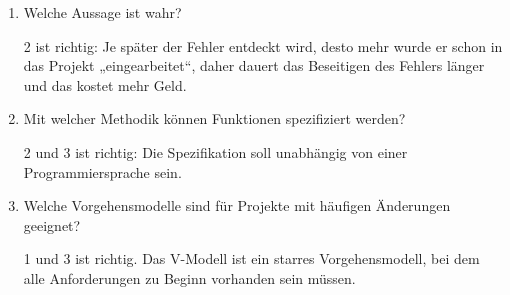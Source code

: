 \documentclass{lehramt-informatik}
\begin{document}
\begin{enumerate}


\item Welche Aussage ist wahr?


\begin{antwort}
2 ist richtig: Je später der Fehler entdeckt wird, desto mehr wurde er
schon in das Projekt „eingearbeitet“, daher dauert das Beseitigen des
Fehlers länger und das kostet mehr Geld.
\end{antwort}


\item  Mit welcher Methodik können Funktionen spezifiziert werden?


\begin{antwort}
2 und 3 ist richtig: Die Spezifikation soll unabhängig von einer
Programmiersprache sein.
\end{antwort}


\item Welche Vorgehensmodelle sind für Projekte mit häufigen Änderungen
geeignet?


\begin{antwort}
1 und 3 ist richtig. Das V-Modell ist ein starres Vorgehensmodell, bei
dem alle Anforderungen zu Beginn vorhanden sein müssen.
\end{antwort}


\end{enumerate}
\end{document}
